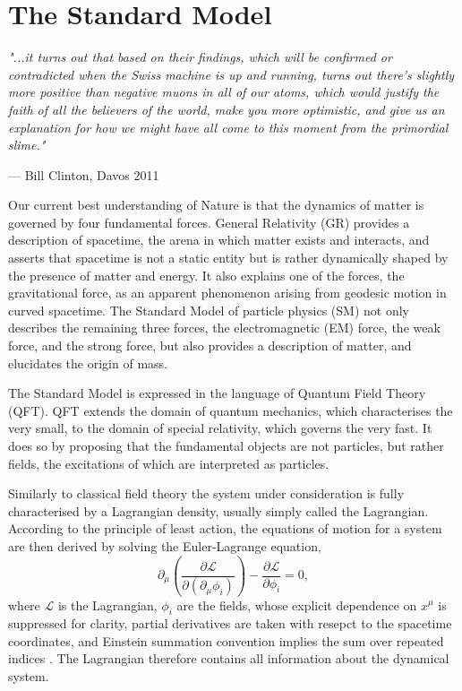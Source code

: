 \chapter{The Standard Model}

\textit{"...it turns out that based on their findings, which will be confirmed
or contradicted when the Swiss machine is up and running, turns out there's
slightly more positive than negative muons in all of our atoms, which would
justify the faith of all the believers of the world, make you more
optimistic, and give us an explanation for how we might have all come to this
moment from the primordial slime."}
\vspace{5mm}
\begin{flushright}
--- Bill Clinton, Davos 2011
\end{flushright}

\thispagestyle{empty}
\newpage

\noindent
Our current best understanding of Nature is that the dynamics of matter is governed
by four fundamental forces. General Relativity (GR) provides a
description of spacetime, the arena in which matter exists and interacts, and asserts
that spacetime is not a static entity but is rather dynamically shaped by the presence
of matter and energy. It also explains one of the forces, the gravitational force, as an apparent
phenomenon arising from geodesic motion in curved spacetime. The Standard Model of particle physics
(SM) not only describes the remaining three forces, the electromagnetic (EM) force,
the weak force, and the strong force, but also provides a description of matter, and 
elucidates the origin of mass.

The Standard Model is expressed in the language of Quantum Field Theory (QFT). QFT 
extends the domain of quantum mechanics, which characterises the very small, to
the domain of special relativity, which governs the very fast. It does so by
proposing that the fundamental objects are not particles, but rather fields, the
excitations of which are interpreted as particles.

Similarly to classical field theory the system under consideration is fully characterised
by a Lagrangian density, usually simply called the Lagrangian. According to
the principle of least action, the equations of motion for a system are then derived
by solving the Euler-Lagrange equation,
\begin{equation}
\partial_\mu \left(\frac{\partial \mathcal{L}}{\partial(\partial_\mu \phi_i)}\right)
- \frac{\partial{\mathcal{L}}}{\partial \phi_i} = 0,
\end{equation}
where $\mathcal{L}$ is the Lagrangian, $\phi_i$ are the fields, whose explicit dependence
on $x^\mu$ is suppressed for clarity, partial derivatives
are taken with resepct to the spacetime coordinates, and Einstein summation convention implies
the sum over repeated indices \cite{Thomson:2013zua}. The Lagrangian therefore contains all
information about the dynamical system. 

